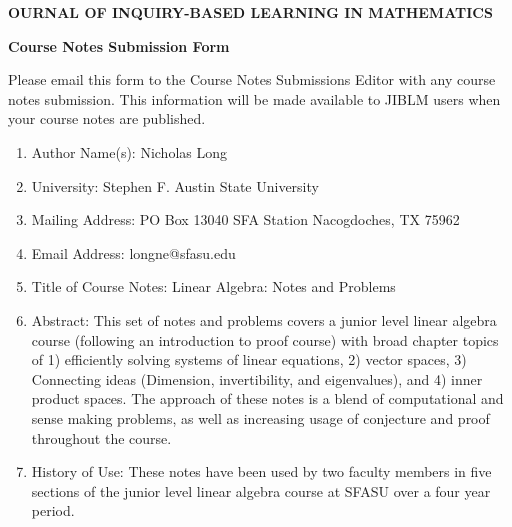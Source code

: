 \documentclass[12pt]{article}
\begin{document}
\begin{center}
{\bf {}OURNAL OF {\Large I}NQUIRY-{\Large B}ASED
{\Large L}EARNING
\medskip
\noindent IN {\Large M}ATHEMATICS}
\end{center}

\medskip
\begin{center}
{\large \bf Course Notes Submission Form}
\end{center}

Please email this form to the Course Notes Submissions Editor with any course notes submission. This information will be made available to JIBLM users when your course notes are published.

\begin{enumerate}

\item Author Name(s): Nicholas Long

\item University: Stephen F. Austin State University

\item Mailing Address: PO Box 13040 SFA Station Nacogdoches, TX 75962

\item Email Address: longne@sfasu.edu

\item Title of Course Notes: Linear Algebra: Notes and Problems

\item Abstract: This set of notes and problems covers a junior level linear algebra course (following an introduction to proof course) with broad chapter topics of 1) efficiently solving systems of linear equations, 2) vector spaces, 3) Connecting ideas (Dimension, invertibility, and eigenvalues), and 4) inner product spaces. The approach of these notes is a blend of computational and sense making problems, as well as increasing usage of conjecture and proof throughout the course.

\item History of Use: These notes have been used by two faculty members in five sections of the junior level linear algebra course at SFASU over a four year period.
\end{enumerate}
\end{document}
